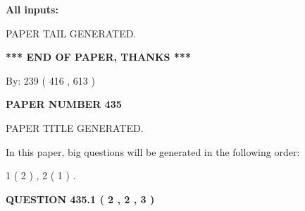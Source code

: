 \documentclass[12pt]{article}
\begin{document}
   
   
   
\noindent{}
   
   
   
   
\noindent\vspace{0.1in}\hspace{-0.08in} {\textbf{\Large{All inputs: }}}
   
   
   
   
   
   
 \vspace{0.2in}
 
   
   
\vspace{2.0in} PAPER TAIL GENERATED.
   
   
   
   
\vspace{1.0in} 
{\textbf{\large{ *** END OF PAPER, THANKS *** }}} 
   
   
\hspace{1.0in} By: 
 239 ( 416 ,  613 )
   
   
   
   
\newpage 
\setcounter{page}{ 
   435001 } 
   
   
   
   
 {\textbf{ \Large{ PAPER NUMBER  435  }}}
   
   
\vspace{0.2in}
   
   
   
   
   
   
   
   
 \vspace{0.2in}
 
 
 
 
   
   
 PAPER TITLE GENERATED.
   
   
   
\vspace{0.2in}
   
In this paper, big questions will be generated in the following order: 
   
   
   1 ( 2 )
 ,
   2 ( 1 )
 .
  
\vspace{0.2in}
  
{\textbf{\Large{QUESTION
435.1 
 ( 2 , 2 , 3 )
}}}
  
\end{document}
